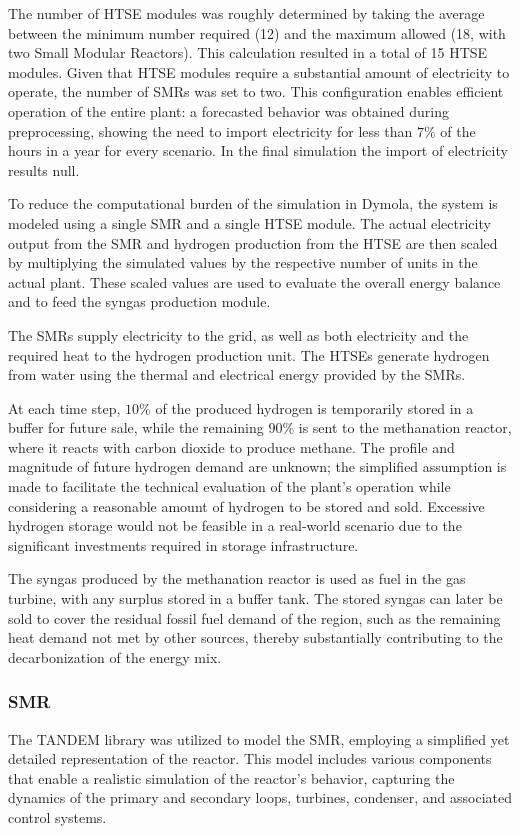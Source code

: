 The number of HTSE modules was roughly determined by taking the average between the minimum number required (12) and the maximum allowed (18, with two Small Modular Reactors). This calculation resulted in a total of 15 HTSE modules. Given that HTSE modules require a substantial amount of electricity to operate, the number of SMRs was set to two. This configuration enables efficient operation of the entire plant: a forecasted behavior was obtained during preprocessing, showing the need to import electricity for less than $7\%$ of the hours in a year for every scenario. In the final simulation the import of electricity results null.

To reduce the computational burden of the simulation in Dymola, the system is modeled using a single SMR and a single HTSE module. The actual electricity output from the SMR and hydrogen production from the HTSE are then scaled by multiplying the simulated values by the respective number of units in the actual plant. These scaled values are used to evaluate the overall energy balance and to feed the syngas production module.

The SMRs supply electricity to the grid, as well as both electricity and the required heat to the hydrogen production unit. The HTSEs generate hydrogen from water using the thermal and electrical energy provided by the SMRs.

At each time step, $10\%$ of the produced hydrogen is temporarily stored in a buffer for future sale, while the remaining $90\%$ is sent to the methanation reactor, where it reacts with carbon dioxide to produce methane. The profile and magnitude of future hydrogen demand are unknown; the simplified assumption is made to facilitate the technical evaluation of the plant's operation while considering a reasonable amount of hydrogen to be stored and sold. Excessive hydrogen storage would not be feasible in a real-world scenario due to the significant investments required in storage infrastructure.

The syngas produced by the methanation reactor is used as fuel in the gas turbine, with any surplus stored in a buffer tank. The stored syngas can later be sold to cover the residual fossil fuel demand of the region, such as the remaining heat demand not met by other sources, thereby substantially contributing to the decarbonization of the energy mix.


\subsubsection{SMR}
The TANDEM library \cite{TANDEM} was utilized to model the SMR, employing a simplified yet detailed representation of the reactor. This model includes various components that enable a realistic simulation of the reactor's behavior, capturing the dynamics of the primary and secondary loops, turbines, condenser, and associated control systems.

